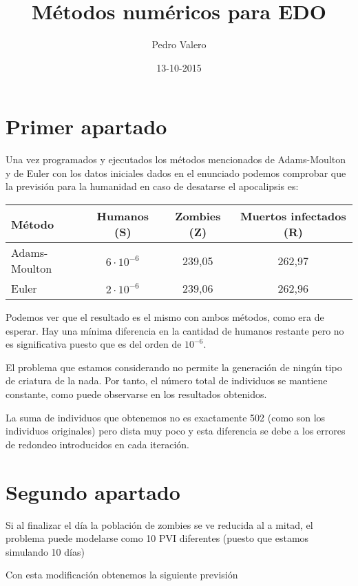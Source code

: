 \documentclass[nochap]{apuntes}
\title{Métodos numéricos para EDO}
\author{Pedro Valero}
\date{13-10-2015}
\begin{document}
\pagestyle{plain}

\section{Primer apartado}
Una vez programados y ejecutados los métodos mencionados de Adams-Moulton y de Euler con los datos iniciales dados en el enunciado podemos comprobar que la previsión para la humanidad en caso de desatarse el apocalipsis es:

\begin{center}
\begin{tabular}{lccc}    \toprule
Método    & Humanos (S)  & Zombies (Z)  & Muertos infectados (R)  \\ \midrule
Adams-Moulton & $6 \cdot 10^{-6}$ & 239,05 & 262,97\\ 
Euler & $2 \cdot 10^{-6}$ & 239,06 & 262,96\\\bottomrule
 \hline
\end{tabular}
\end{center}

Podemos ver que el resultado es el mismo con ambos métodos, como era de esperar. Hay una mínima diferencia en la cantidad de humanos restante pero no es significativa puesto que es del orden de $10^{-6}$.

El problema que estamos considerando no permite la generación de ningún tipo de criatura de la nada. Por tanto, el número total de individuos se mantiene constante, como puede observarse en los resultados obtenidos.

La suma de individuos que obtenemos no es exactamente 502 (como son los individuos originales) pero dista muy poco y esta diferencia se debe a los errores de redondeo introducidos en cada iteración.

\section{Segundo apartado}

Si al finalizar el día la población de zombies se ve reducida al a mitad, el problema puede modelarse como 10 PVI diferentes (puesto que estamos simulando 10 días)

Con esta modificación obtenemos la siguiente previsión
\end{document}
